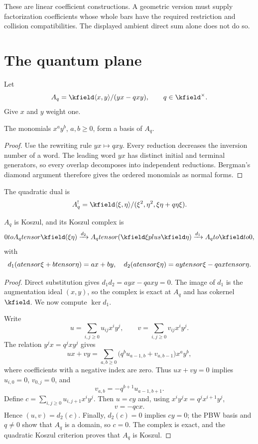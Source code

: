 These are linear coefficient constructions. A geometric version must supply
factorization coefficients whose whole bars have the required restriction and
collision compatibilities. The displayed ambient direct sum alone does not do so.

\section{The quantum plane}
Let
\[
 A_q=\kfield\angles{x,y}/(yx-qxy),\qquad q\in\kfield^\times.
\]
Give $x$ and $y$ weight one.

\begin{theorem}
The monomials $x^ay^b$, $a,b\ge0$, form a basis of $A_q$.
\end{theorem}
\begin{proof}
Use the rewriting rule $yx\mapsto qxy$. Every reduction decreases the inversion number of a word. The leading word $yx$ has distinct initial and terminal generators, so every overlap decomposes into independent reductions. Bergman's diamond argument therefore gives the ordered monomials as normal forms.
\end{proof}

The quadratic dual is
\[
 A_q^!=\kfield\angles{\xi,\eta}/(\xi^2,\eta^2,\xi\eta+q\eta\xi).
\]

\begin{theorem}[Koszulness]
$A_q$ is Koszul, and its Koszul complex is
\[
 0\to A_q\tensor\kfield(\xi\eta)
 \xrightarrow{d_2}
 A_q\tensor(\kfield\xi\oplus\kfield\eta)
 \xrightarrow{d_1}A_q\to\kfield\to0,
\]
with
\[
 d_1(atensor\xi+btensor\eta)=ax+by,
\quad
 d_2(atensor\xi\eta)=aytensor\xi-qaxtensor\eta.
\]
\end{theorem}
\begin{proof}
Direct substitution gives $d_1d_2=ayx-qaxy=0$. The image of $d_1$ is the augmentation ideal $(x,y)$, so the complex is exact at $A_q$ and has cokernel $\kfield$. We now compute $\ker d_1$.

Write
\[
 u=\sum_{i,j\ge0}u_{ij}x^iy^j,
 \qquad
 v=\sum_{i,j\ge0}v_{ij}x^iy^j.
\]
The relation $y^jx=q^jxy^j$ gives
\[
 ux+vy=\sum_{a,b\ge0}
 \bigl(q^b u_{a-1,b}+v_{a,b-1}\bigr)x^ay^b,
\]
where coefficients with a negative index are zero. Thus $ux+vy=0$ implies $u_{i,0}=0$, $v_{0,j}=0$, and
\[
 v_{a,b}=-q^{b+1}u_{a-1,b+1}.
\]
Define $c=\sum_{i,j\ge0}u_{i,j+1}x^iy^j$. Then $u=cy$ and, using $x^iy^jx=q^jx^{i+1}y^j$,
\[
 v=-qcx.
\]
Hence $(u,v)=d_2(c)$. Finally, $d_2(c)=0$ implies $cy=0$; the PBW basis and $q\ne0$ show that $A_q$ is a domain, so $c=0$. The complex is exact, and the quadratic Koszul criterion proves that $A_q$ is Koszul.
\end{proof}

